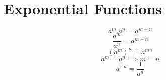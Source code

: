 \section{Exponential Functions}
\begin{equation}
\label{amn}
a^m . a^n  = a^{m+n}
\end{equation}
\begin{equation}
\label{am/n}
\frac{a^m}{a^n}  = a^{m-n}
\end{equation}
\begin{equation}
\label{a^mn}
({a^m})^{n} = a^{mn}
\end{equation}
\begin{equation}
\label{am_equal_an}
a^m = a^n \implies m = n
\end{equation}
\begin{equation}
\label{atominusn}
a^{-n} = \frac{1}{a^n}
\end{equation}